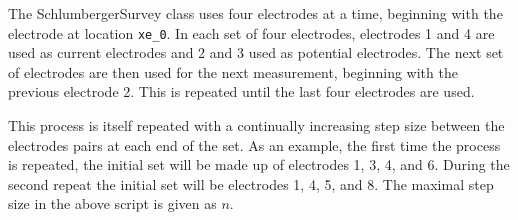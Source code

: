 The SchlumbergerSurvey class uses four electrodes at a time, beginning with the
electrode at location \texttt{xe_0}. In each set of four electrodes, electrodes
1 and 4 are used as current electrodes and 
2 and 3 used as potential electrodes. The next set of electrodes are then used
for the next measurement, beginning with the previous electrode 2. This is 
repeated until the last four electrodes are used.

This process is itself repeated with a continually increasing step size between
the electrodes pairs at each end of the set. As an example, the first time the
process is repeated, the initial set will be made up of electrodes 1, 3, 4, and
6. During the second repeat the initial set will be electrodes 1, 4, 5, and 8.
The maximal step size in the above script is given as $n$.
 
